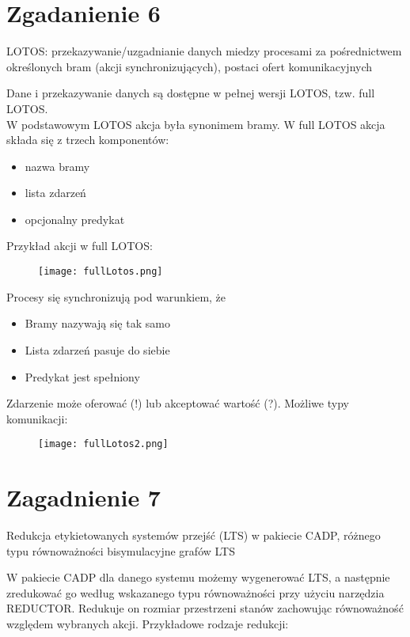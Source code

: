 \documentclass[a4paper,15pt]{article}
\newcommand{\issue}[2]{
    \begin{tcolorbox}[colback=issueColor!5!white,colframe=issueColor,title={Zagadnienie #1}]
        #2
    \end{tcolorbox}
}
\begin{document}
\newpage
\section{Zgadanienie 6}

\issue{6}{
LOTOS: przekazywanie/uzgadnianie danych miedzy procesami za
pośrednictwem określonych bram (akcji synchronizujących), postaci ofert komunikacyjnych
}

Dane i przekazywanie danych są dostępne w pełnej wersji LOTOS, tzw. full LOTOS. \\ 
W podstawowym LOTOS akcja była synonimem bramy. W full LOTOS akcja składa się z trzech komponentów: 
\begin{itemize}
\item nazwa bramy
\item lista zdarzeń
\item opcjonalny predykat
\end{itemize}

Przykład akcji w full LOTOS:\

\begin{figure}[H]
\centerline{\texttt{[image: fullLotos.png]}}
\end{figure}

Procesy się synchronizują pod warunkiem, że 
\begin{itemize}
\item Bramy nazywają się tak samo
\item Lista zdarzeń pasuje do siebie
\item Predykat jest spełniony
\end{itemize}


Zdarzenie może oferować (!) lub akceptować wartość (?). 
Możliwe typy komunikacji: 

\begin{figure}[H]
\centerline{\texttt{[image: fullLotos2.png]}}
\end{figure}


\newpage
\section{Zagadnienie 7}

\issue{7}{
Redukcja etykietowanych systemów przejść (LTS) w pakiecie CADP, różnego typu równoważności bisymulacyjne grafów LTS
}

W pakiecie CADP dla danego systemu możemy wygenerować LTS, a następnie zredukować go według wskazanego typu równoważności przy użyciu narzędzia REDUCTOR. Redukuje on rozmiar przestrzeni stanów zachowując równoważność względem wybranych akcji. Przykładowe rodzaje redukcji:
\end{document}
